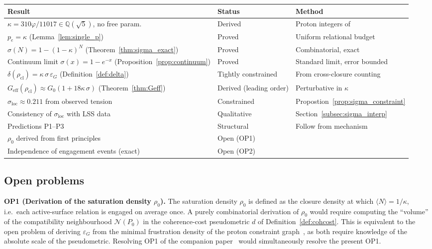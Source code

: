 \documentclass[11pt,a4paper]{article}
\theoremstyle{definition}
\newcommand{\epsg}{\varepsilon_G}
\newcommand{\Geff}{G_{\mathrm{eff}}}
\newcommand{\Gzero}{G_0}
\newcommand{\vp}{\varphi}
\newcommand{\kap}{\kappa}
\newcommand{\sig}{\sigma}
\newcommand{\rhocl}{\rho_{\mathrm{cl}}}
\newcommand{\rhoO}{\rho_0}
\begin{document}
\begin{center}
\begin{tabular}{lll}
\toprule
Result & Status & Method \\
\midrule
$\kap = 310\vp/11017 \in \mathbb{Q}(\sqrt{5})$, no free param. & Derived & Proton integers of~\cite{PDL_Bridge_2026} \\
$p_e = \kap$ (Lemma~\ref{lem:single_p}) & Proved & Uniform relational budget \\
$\sig(N) = 1-(1-\kap)^N$ (Theorem~\ref{thm:sigma_exact}) & Proved & Combinatorial, exact \\
Continuum limit $\sig(x) = 1-e^{-x}$ (Proposition~\ref{prop:continuum}) & Proved & Standard limit, error bounded \\
$\delta(\rhocl) = \kap\,\sig\,\epsg$ (Definition~\ref{def:delta}) & Tightly constrained & From cross-closure counting \\
$\Geff(\rhocl) \approx \Gzero(1+18\kap\,\sig)$ (Theorem~\ref{thm:Geff}) & Derived (leading order) & Perturbative in $\kap$ \\
$\sig_{\mathrm{loc}} \approx 0.211$ from observed tension & Constrained & Propostion~\ref{prop:sigma_constraint} \\
Consistency of $\sig_{\mathrm{loc}}$ with LSS data & Qualitative & Section~\ref{subsec:sigma_interp} \\
Predictions P1--P3 & Structural & Follow from mechanism \\
$\rhoO$ derived from first principles & Open (OP1) & \\
Independence of engagement events (exact) & Open (OP2) & \\
\bottomrule
\end{tabular}
\end{center}

\subsection{Open problems}
\label{subsec:open}

\medskip\noindent\textbf{OP1 (Derivation of the saturation density $\rhoO$).} The saturation density $\rhoO$ is defined as the closure density at which $\langle N\rangle = 1/\kap$, i.e.\ each active-surface relation is engaged on average once. A purely combinatorial derivation of $\rhoO$ would require computing the ``volume'' of the compatibility neighbourhood $\mathcal{N}(P_0)$ in the coherence-cost pseudometric $d$ of Definition~\ref{def:cohcost}. This is equivalent to the open problem of deriving $\epsg$ from the minimal frustration density of the proton constraint graph~\cite{PDL_Bridge_2026}, as both require knowledge of the absolute scale of the pseudometric. Resolving OP1 of the companion paper~\cite{PDL_Bridge_2026} would simultaneously resolve the present OP1.
\end{document}
